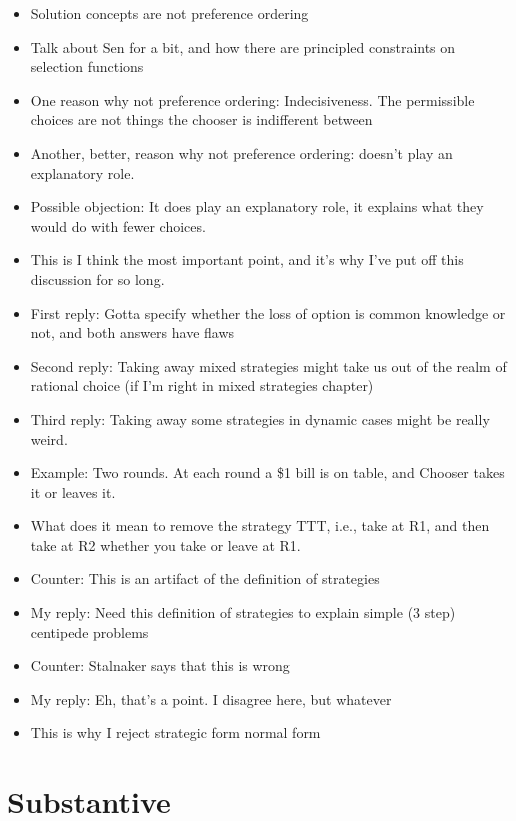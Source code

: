 \documentclass[
  12pt,
  letterpaper,
  DIV=11,
  numbers=noendperiod]{scrreprt}
\providecommand{\tightlist}{%
  \setlength{\itemsep}{0pt}\setlength{\parskip}{0pt}}\usepackage{longtable,booktabs,array}
\begin{document}
\begin{itemize}
\tightlist
\item
  Solution concepts are not preference ordering
\item
  Talk about Sen for a bit, and how there are principled constraints on
  selection functions
\item
  One reason why not preference ordering: Indecisiveness. The
  permissible choices are not things the chooser is indifferent between
\item
  Another, better, reason why not preference ordering: doesn't play an
  explanatory role.
\item
  Possible objection: It does play an explanatory role, it explains what
  they would do with fewer choices.
\item
  This is I think the most important point, and it's why I've put off
  this discussion for so long.
\item
  First reply: Gotta specify whether the loss of option is common
  knowledge or not, and both answers have flaws
\item
  Second reply: Taking away mixed strategies might take us out of the
  realm of rational choice (if I'm right in mixed strategies chapter)
\item
  Third reply: Taking away some strategies in dynamic cases might be
  really weird.
\item
  Example: Two rounds. At each round a \$1 bill is on table, and Chooser
  takes it or leaves it.
\item
  What does it mean to remove the strategy TTT, i.e., take at R1, and
  then take at R2 whether you take or leave at R1.
\item
  Counter: This is an artifact of the definition of strategies
\item
  My reply: Need this definition of strategies to explain simple (3
  step) centipede problems
\item
  Counter: Stalnaker says that this is wrong
\item
  My reply: Eh, that's a point. I disagree here, but whatever
\item
  This is why I reject strategic form normal form
\end{itemize}


\hypertarget{sec-substantive}{%
\chapter{Substantive}\label{sec-substantive}}
\end{document}
